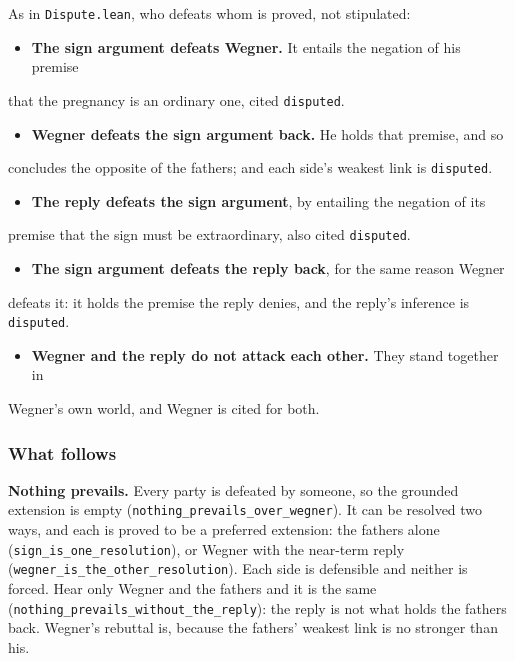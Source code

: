 \documentclass[11pt]{article}
\begin{document}
As in \texttt{Dispute.lean}, who defeats whom is proved, not stipulated:

\begin{itemize}
  \item \textbf{The sign argument defeats Wegner.} It entails the negation of his premise
\end{itemize}
  that the pregnancy is an ordinary one, cited \texttt{disputed}.

\begin{itemize}
  \item \textbf{Wegner defeats the sign argument back.} He holds that premise, and so
\end{itemize}
  concludes the opposite of the fathers; and each side's weakest link is   \texttt{disputed}.

\begin{itemize}
  \item \textbf{The reply defeats the sign argument}, by entailing the negation of its
\end{itemize}
  premise that the sign must be extraordinary, also cited \texttt{disputed}.

\begin{itemize}
  \item \textbf{The sign argument defeats the reply back}, for the same reason Wegner
\end{itemize}
  defeats it: it holds the premise the reply denies, and the reply's inference   is \texttt{disputed}.

\begin{itemize}
  \item \textbf{Wegner and the reply do not attack each other.} They stand together in
\end{itemize}
  Wegner's own world, and Wegner is cited for both.

\subsubsection*{What follows}
\textbf{Nothing prevails.} Every party is defeated by someone, so the grounded extension is empty (\texttt{nothing\_\allowbreak{}prevails\_\allowbreak{}over\_\allowbreak{}wegner}). It can be resolved two ways, and each is proved to be a preferred extension: the fathers alone (\texttt{sign\_\allowbreak{}is\_\allowbreak{}one\_\allowbreak{}resolution}), or Wegner with the near-term reply (\texttt{wegner\_\allowbreak{}is\_\allowbreak{}the\_\allowbreak{}other\_\allowbreak{}resolution}). Each side is defensible and neither is forced. Hear only Wegner and the fathers and it is the same (\texttt{nothing\_\allowbreak{}prevails\_\allowbreak{}without\_\allowbreak{}the\_\allowbreak{}reply}): the reply is not what holds the fathers back. Wegner's rebuttal is, because the fathers' weakest link is no stronger than his.
\end{document}

